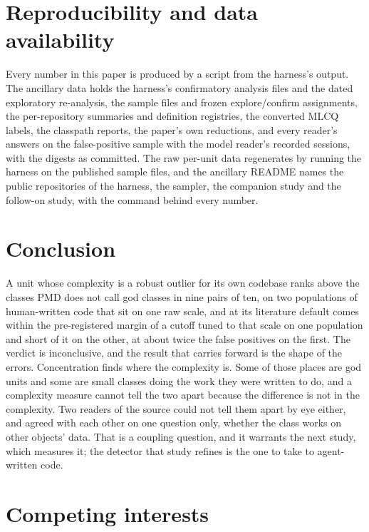 \documentclass[11pt,a4paper]{article}
\begin{document}
\section{Reproducibility and data availability}
\label{sec:repro}

Every number in this paper is produced by a script from the harness's output.
The ancillary data holds the harness's confirmatory analysis files and the
dated exploratory re-analysis, the sample files and frozen explore/confirm
assignments, the per-repository summaries and definition registries, the
converted MLCQ labels, the classpath reports, the paper's own reductions, and
every reader's answers on the false-positive sample with the model reader's
recorded sessions, with the digests as committed. The raw per-unit data
regenerates by running the harness on the published sample files, and the
ancillary README names the public repositories of the harness, the sampler,
the companion study and the follow-on study, with the command behind every
number.

\section{Conclusion}

A unit whose complexity is a robust outlier for its own codebase ranks above
the classes PMD does not call god classes in nine pairs of ten, on two
populations of human-written code that sit on one raw scale, and at its
literature default comes within the pre-registered margin of a cutoff tuned
to that scale on one population and short of it on the other, at about twice
the false positives on the first. The verdict is inconclusive, and the result
that carries forward is the shape of the errors. Concentration finds where
the complexity is. Some of those places are god units and some
are small classes doing the work they were written to do, and a complexity
measure cannot tell the two apart because the difference is not in the
complexity. Two readers of the source could not tell them apart by eye
either, and agreed with each other on one question only, whether the class
works on other objects' data. That is a coupling question, and it warrants
the next study, which measures it; the detector that study refines is the one
to take to agent-written code.

\section*{Competing interests}
\end{document}
